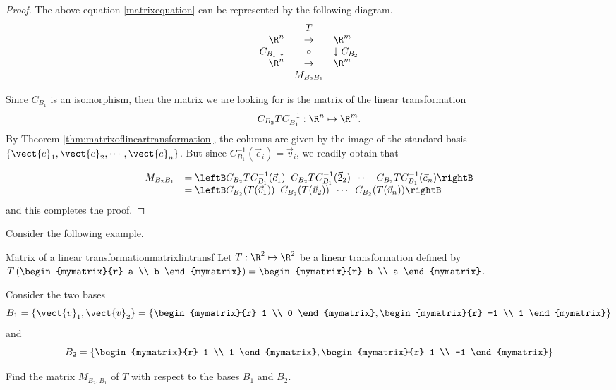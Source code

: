 \begin{proof}
The above equation \ref{matrixequation} can be represented by the following diagram.
\begin{equation*}
\begin{array}{rrcll}
&  & T &  &  \\
& \R^n & \rightarrow  & \R^m & \\
& C_{B_{1} }\downarrow  & \circ  & \downarrow C_{B_{2} } &  \\
& \R^{n} & \rightarrow  & \R^{m} &  \\
&  & M_{B_{2} B_{1} } &  &
\end{array}
\end{equation*}

Since $C_{B_1}$ is an isomorphism, then the matrix we are looking for is the matrix of the linear transformation 
\[   C_{B_2} T C^{-1}_{B_1} : \R^n \mapsto \R^m. \]
By Theorem \ref{thm:matrixoflineartransformation}, the columns are
given by the image of the standard basis $\left\{ \vect{e}_1,
\vect{e}_2, \cdots, \vect{e}_n \right\}$. But since $C^{-1}_{B_1}( \vec{e}_i) = \vec{v}_i$, we readily obtain that 

\[ \begin{array}{ll} 
M_{B_{2} B_{1}} 
& = \leftB C_{B_2}T C^{-1}_{B_1} (\vec{e}_1) \;\; C_{B_2}T C^{-1}_{B_1} (\vec{2}_2) \;\; \cdots \;\; C_{B_2}T C^{-1}_{B_1} (\vec{e}_n) \rightB \\
& = \leftB C_{B_2}(T(\vec{v}_1)) \;\; C_{B_2}(T(\vec{v}_2)) \;\; \cdots \;\; C_{B_2}(T(\vec{v}_n)) \rightB 
\end{array}\]
and this completes the proof. 
\end{proof}

Consider the following example.

\begin{example}{Matrix of a linear transformation}{matrixlintransf}
Let $T: \R^2 \mapsto \R^2$ be a linear transformation defined by $T \left( \begin{mymatrix}{r}
a \\
b
\end{mymatrix} \right) = \begin{mymatrix}{r}
b \\
a 
\end{mymatrix}$. 

Consider the two bases
\[
B_1 = \left\{ \vect{v}_{1}, \vect{v}_{2} \right\} = \left\{ \begin{mymatrix}{r}
1 \\
0
\end{mymatrix}, \begin{mymatrix}{r}
-1 \\
1
\end{mymatrix}
\right\}
\]
 and 
\[
B_2 = \left\{ \begin{mymatrix}{r}
1 \\
1
\end{mymatrix}, \begin{mymatrix}{r}
1 \\
-1
\end{mymatrix}
\right\}
\]

Find the matrix $M_{B_2,B_1}$ of $T$ with respect to the bases $B_1$ and $B_2$. 
\end{example}

